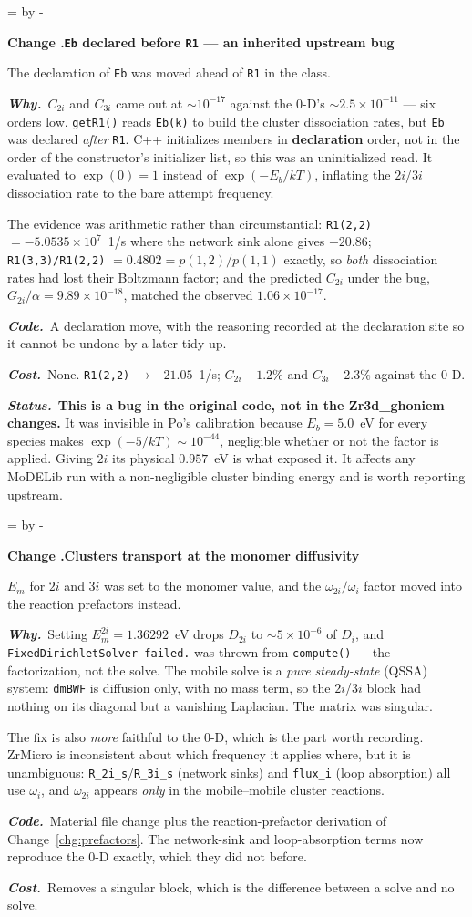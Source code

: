 \documentclass[11pt,a4paper]{article}
\newcommand{\code}[1]{\texttt{\small #1}}
\newcommand{\needlines}[1]{%
  \par\dimen0=\pagegoal \advance\dimen0 by -\pagetotal
  \ifdim\dimen0<#1\baselineskip \newpage \fi}
\newcounter{chg}
\newcommand{\change}[1]{%
  \needlines{4}%
  \refstepcounter{chg}%
  \par\medskip\noindent
  {\bfseries\boldmath Change \thechg.\quad #1}%
  \par\nobreak\smallskip}
\newcommand{\why}[1]{\par\noindent\textbf{\itshape Why.}\ #1\par}
\newcommand{\impact}[1]{\par\noindent\textbf{\itshape Code.}\ #1\par}
\newcommand{\cost}[1]{\par\noindent\textbf{\itshape Cost.}\ #1\par}
\newcommand{\status}[1]{\par\noindent\textbf{\itshape Status.}\ #1\par}
\begin{document}
\change{\code{Eb} declared before \code{R1} --- an inherited upstream bug}
\label{chg:eb}
The declaration of \code{Eb} was moved ahead of \code{R1} in the class.
\why{$C_{2i}$ and $C_{3i}$ came out at $\sim10^{-17}$ against the 0-D's
$\sim2.5\times10^{-11}$ --- six orders low. \code{getR1()} reads \code{Eb(k)}
to build the cluster dissociation rates, but \code{Eb} was declared
\emph{after} \code{R1}. C++ initializes members in \textbf{declaration} order,
not in the order of the constructor's initializer list, so this was an
uninitialized read. It evaluated to $\exp(0)=1$ instead of $\exp(-E_b/kT)$,
inflating the $2i$/$3i$ dissociation rate to the bare attempt frequency.

The evidence was arithmetic rather than circumstantial: \code{R1(2,2)} $=
-5.0535\times10^{7}$~1/s where the network sink alone gives $-20.86$;
\code{R1(3,3)/R1(2,2)} $= 0.4802 = p(1,2)/p(1,1)$ exactly, so \emph{both}
dissociation rates had lost their Boltzmann factor; and the predicted
$C_{2i}$ under the bug, $G_{2i}/\alpha = 9.89\times10^{-18}$, matched the
observed $1.06\times10^{-17}$.}
\impact{A declaration move, with the reasoning recorded at the declaration
site so it cannot be undone by a later tidy-up.}
\cost{None. \code{R1(2,2)} $\rightarrow -21.05$~1/s; $C_{2i}$ $+1.2\%$ and
$C_{3i}$ $-2.3\%$ against the 0-D.}
\status{\textbf{This is a bug in the original code, not in the Zr3d\_ghoniem
changes.} It was invisible in Po's calibration because $E_b = 5.0$~eV for
every species makes $\exp(-5/kT) \sim 10^{-44}$, negligible whether or not the
factor is applied. Giving $2i$ its physical $0.957$~eV is what exposed it. It
affects any MoDELib run with a non-negligible cluster binding energy and is
worth reporting upstream.}

\change{Clusters transport at the monomer diffusivity}
\label{chg:clusterdiff}
$E_m$ for $2i$ and $3i$ was set to the monomer value, and the
$\omega_{2i}/\omega_i$ factor moved into the reaction prefactors instead.
\why{Setting $E_m^{2i} = 1.36292$~eV drops $D_{2i}$ to $\sim5\times10^{-6}$ of
$D_i$, and \code{FixedDirichletSolver failed.} was thrown from
\code{compute()} --- the factorization, not the solve. The mobile solve is a
\emph{pure steady-state} (QSSA) system: \code{dmBWF} is diffusion only, with no
mass term, so the $2i$/$3i$ block had nothing on its diagonal but a vanishing
Laplacian. The matrix was singular.

The fix is also \emph{more} faithful to the 0-D, which is the part worth
recording. ZrMicro is inconsistent about which frequency it applies where, but
it is unambiguous: \code{R\_2i\_s}/\code{R\_3i\_s} (network sinks) and
\code{flux\_i} (loop absorption) all use $\omega_i$, and $\omega_{2i}$ appears
\emph{only} in the mobile--mobile cluster reactions.}
\impact{Material file change plus the reaction-prefactor derivation of
Change~\ref{chg:prefactors}. The network-sink and loop-absorption terms now
reproduce the 0-D exactly, which they did not before.}
\cost{Removes a singular block, which is the difference between a solve and no
solve.}
\end{document}
